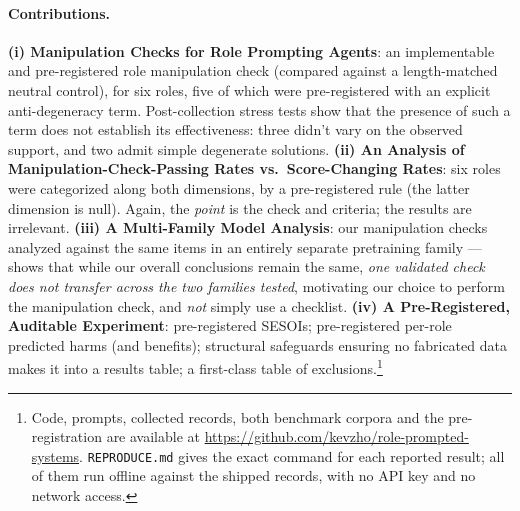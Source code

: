\paragraph{Contributions.}
\textbf{(i) Manipulation Checks for Role Prompting Agents}: an implementable and pre-registered
role manipulation check (compared against a length-matched neutral control), for six roles, five
of which were pre-registered with an explicit anti-degeneracy term. Post-collection stress tests
show that the presence of such a term does not establish its effectiveness: three didn't vary on
the observed support, and two admit simple degenerate solutions.
\textbf{(ii) An Analysis of Manipulation-Check-Passing Rates vs.\ Score-Changing Rates}: six
roles were categorized along both dimensions, by a pre-registered rule (the latter dimension is
null). Again, the \emph{point} is the check and criteria; the results are irrelevant.
\textbf{(iii) A Multi-Family Model Analysis}: our manipulation checks analyzed against the same
items in an entirely separate pretraining family --- shows that while our overall conclusions
remain the same, \emph{one validated check does not transfer across the two families tested},
motivating our choice to perform the manipulation check, and \emph{not} simply use a checklist.
\textbf{(iv) A Pre-Registered, Auditable Experiment}: pre-registered SESOIs; pre-registered
per-role predicted harms (and benefits); structural safeguards ensuring no fabricated data makes
it into a results table; a first-class table of exclusions.\footnote{Code, prompts, collected
records, both benchmark corpora and the pre-registration are available at
\url{https://github.com/kevzho/role-prompted-systems}. \texttt{REPRODUCE.md} gives
the exact command for each reported result; all of them run offline against the shipped records,
with no API key and no network access.}
